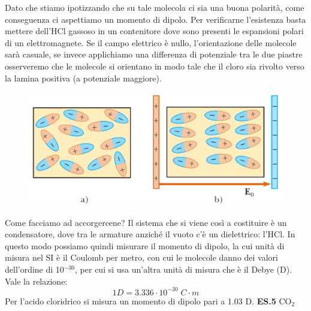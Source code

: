 Dato che stiamo ipotizzando che su tale molecola ci sia una buona polarità, come conseguenza ci aspettiamo un momento di dipolo.
Per verificarne l'esistenza basta mettere dell'HCl gassoso in un contenitore dove sono presenti le espansioni polari di un elettromagnete. Se il campo elettrico è nullo, l'orientazione delle molecole sarà casuale, se invece applichiamo una differenza di potenziale tra le due piastre osserveremo che le molecole si orientano in modo tale che il cloro sia rivolto verso la lamina positiva (a potenziale maggiore).
\begin{figure}[htp]
    \centering
    \includegraphics[width=12cm]{immagini/condensatore.png}
\end{figure}
Come facciamo ad accorgercene?
Il sistema che si viene così a costituire è un condensatore, dove tra le armature anziché il vuoto c'è un dielettrico: l'HCl. In questo modo possiamo quindi misurare il momento di dipolo, la cui unità di misura nel SI è il Coulomb per metro, con cui le molecole danno dei valori dell'ordine di 10$^{-30}$, per cui si usa un'altra unità di misura che è il Debye (D). Vale la relazione:
$$1D=3.336\cdot10^{-30}\;C\cdot m$$
Per l'acido cloridrico si misura un momento di dipolo pari a 1.03 D.
\newpage
\vspace{0.2cm}\textbf{ES.5} CO$_2$

